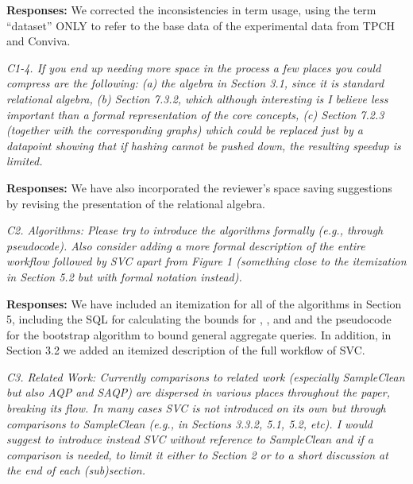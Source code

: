 {\bf Responses:} We corrected the inconsistencies in term usage, using the term “dataset” ONLY to refer to the base data of the experimental data from TPCH and Conviva. 

\vspace{1em}
\emph{C1-4. If you end up needing more space in the process a few places you could compress are the following: (a) the algebra in Section 3.1, since it is standard relational algebra, (b) Section 7.3.2, which although interesting is I believe less important than a formal representation of the core concepts, (c) Section 7.2.3 (together with the corresponding graphs) which could be replaced just by a datapoint showing that if hashing cannot be pushed down, the resulting speedup is limited.}

\vspace{.25em}

{\bf Responses:} We have also incorporated the reviewer’s space saving suggestions by revising the presentation of the relational algebra. 

\vspace{1em}
\emph{C2. Algorithms: Please try to introduce the algorithms formally (e.g., through pseudocode). Also consider adding a more formal description of the entire workflow followed by SVC apart from Figure 1 (something close to the itemization in Section 5.2 but with formal notation instead).}

\vspace{.25em}

{\bf Responses:} We have included an itemization for all of the algorithms in Section 5, including the SQL for calculating the bounds for \sumfunc, \avgfunc, and \countfunc and the pseudocode for the bootstrap algorithm to bound general aggregate queries. In addition, in Section 3.2 we added an itemized description of the full workflow of SVC.

\vspace{1em}
\emph{C3. Related Work: Currently comparisons to related work (especially SampleClean but also AQP and SAQP) are dispersed in various places throughout the paper, breaking its flow. In many cases SVC is not introduced on its own but through comparisons to SampleClean (e.g., in Sections 3.3.2, 5.1, 5.2, etc). I would suggest to introduce instead SVC without reference to SampleClean and if a comparison is needed, to limit it either to Section 2 or to a short discussion at the end of each (sub)section.}

\vspace{.25em}

